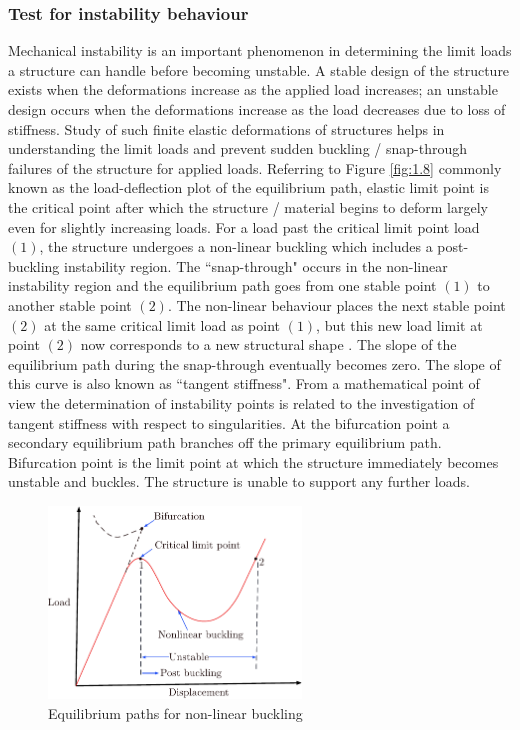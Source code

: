 \documentclass[11pt,a4paper,final]{article}
\begin{document}
\subsubsection{Test for instability behaviour}

Mechanical instability is an important phenomenon in determining the limit loads a structure can handle before becoming unstable. A stable design of the structure exists when the deformations increase as the applied load increases; an unstable design occurs when the deformations increase as the load decreases due to loss of stiffness. Study of such finite elastic deformations of structures helps in understanding the limit loads and prevent sudden buckling / snap-through failures of the structure for applied loads. Referring to Figure \eqref{fig:1.8} commonly known as the load-deflection plot of the equilibrium path, elastic limit point is the critical point after which the structure / material begins to deform largely even for slightly increasing loads. For a load past the critical limit point load $(1)$, the structure undergoes a non-linear buckling which includes a post-buckling instability region. The ``snap-through" occurs in the non-linear instability region and the equilibrium path goes from one stable point $(1)$ to another stable point $(2)$. The non-linear behaviour places the next stable point $(2)$ at the same critical limit load as point $(1)$, but this new load limit at point $(2)$ now corresponds to a new structural shape \cite{Hrinda2010}. The slope of the equilibrium path during the snap-through eventually becomes zero. The slope of this curve is also known as ``tangent stiffness". From a mathematical point of view the determination of instability points is related to the investigation of tangent stiffness with respect to singularities. At the bifurcation point a secondary equilibrium path branches off the primary equilibrium path. Bifurcation point is the limit point at which the structure immediately becomes unstable and buckles. The structure is unable to support any further loads. \par 

\begin{figure}[h]
\centering 
\includegraphics[width=0.6\textwidth]{nonlinear_eq_path.pdf}
\caption{Equilibrium paths for non-linear buckling}
\label{fig:1.8}
\end{figure}
\end{document}
